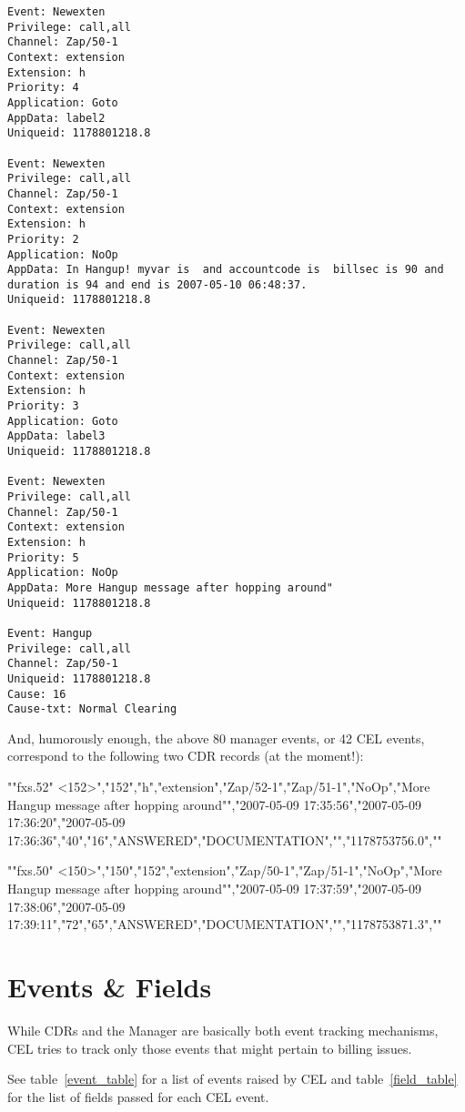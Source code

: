 \begin{astlisting}
\begin{verbatim}
Event: Newexten
Privilege: call,all
Channel: Zap/50-1
Context: extension
Extension: h
Priority: 4
Application: Goto
AppData: label2
Uniqueid: 1178801218.8

Event: Newexten
Privilege: call,all
Channel: Zap/50-1
Context: extension
Extension: h
Priority: 2
Application: NoOp
AppData: In Hangup! myvar is  and accountcode is  billsec is 90 and duration is 94 and end is 2007-05-10 06:48:37.
Uniqueid: 1178801218.8

Event: Newexten
Privilege: call,all
Channel: Zap/50-1
Context: extension
Extension: h
Priority: 3
Application: Goto
AppData: label3
Uniqueid: 1178801218.8

Event: Newexten
Privilege: call,all
Channel: Zap/50-1
Context: extension
Extension: h
Priority: 5
Application: NoOp
AppData: More Hangup message after hopping around"
Uniqueid: 1178801218.8

Event: Hangup
Privilege: call,all
Channel: Zap/50-1
Uniqueid: 1178801218.8
Cause: 16
Cause-txt: Normal Clearing
\end{verbatim}
\end{astlisting}

And, humorously enough, the above 80 manager events, or 42 CEL events,
correspond to the following two CDR records (at the moment!):

\begin{astlisting}
""fxs.52" <152>","152","h","extension","Zap/52-1","Zap/51-1","NoOp","More Hangup message after hopping around"","2007-05-09 17:35:56","2007-05-09 17:36:20","2007-05-09 17:36:36","40","16","ANSWERED","DOCUMENTATION","","1178753756.0",""

""fxs.50" <150>","150","152","extension","Zap/50-1","Zap/51-1","NoOp","More Hangup message after hopping around"","2007-05-09 17:37:59","2007-05-09 17:38:06","2007-05-09 17:39:11","72","65","ANSWERED","DOCUMENTATION","","1178753871.3",""
\end{astlisting}


\section{Events \& Fields}

While CDRs and the Manager are basically both event tracking mechanisms, CEL
tries to track only those events that might pertain to billing issues.

See table~\ref{event_table} for a list of events raised by CEL and
table~\ref{field_table} for the list of fields passed for each CEL event.

